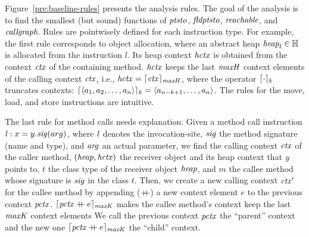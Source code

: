 Figure~\ref{pre:baseline-rules} presents the analysis rules. The goal of the analysis is to find the smallest (but sound) functions of $\textit{ptsto}$, $\textit{fldptsto}$, $\textit{reachable}$, and $\textit{callgraph}$.
Rules are pointwisely defined for each instruction type.  For example, the first rule corresponds to object allocation, where an abstract heap
${\it heap}_l \in \mathbb{H}$ is allocated from the instruction $l$. 
Its heap context ${\it hctx}$ is obtained from the context ${\it ctx}$ of the containing method.
${\it hctx}$ keeps the last ${\it maxH}$ context elements of the calling context ${\it ctx}$, i.e.,
${\it hctx} = {\lceil {\it ctx} \rceil_{{\it maxH}}}$, where the operator
${\lceil \cdot \rceil_{k}}$ truncates contexts:
${\lceil \langle a_1, a_2, \dots, a_n \rangle  \rceil_{k}} = \langle
  a_{n-k+1}, \dots, a_n \rangle$.
The rules for the move, load, and store instructions are intuitive. 


The last rule for method calls needs explanation. 
Given a method call instruction
${\it l}:x = y.{\it sig}(arg)$, where ${\it l}$ denotes the
invocation-site, ${\it sig}$ the method signature (name and type), and
${\it arg}$ an actual parameter, we find the calling context ${\it ctx}$
of the caller method, $({\it heap},{\it hctx})$ the receiver object and its heap
context that {\it y}
points to, $t$ the class type of the receiver object ${\it heap}$, and $m$ 
the callee method whose signature is ${\it sig}$ in the class $t$. 
Then, we create a new calling context ${\it ctx}'$ for the callee
method by appending ($\mathbin{{+}\mspace{-8mu}{+}}$) a new context element $e$
to the previous context ${\it pctx}$.
${\lceil {\it pctx} \mathbin{{+}\mspace{-8mu}{+}} e \rceil_{{\it maxK}}}$ makes the callee method's context keep the last ${\it maxK}$ context elements
We call the previous context ${\it pctx}$ the ``parent'' context and the new
one ${\lceil {\it pctx} \mathbin{{+}\mspace{-8mu}{+}} e \rceil_{{\it maxK}}}$ the ``child''
context.

